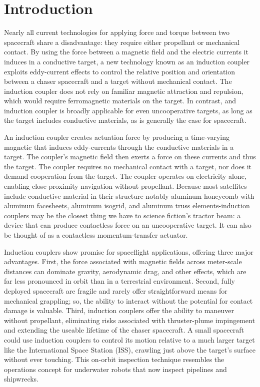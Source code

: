 \section{Introduction} 

Nearly all current technologies for applying force and torque between two spacecraft share a disadvantage: they require either propellant or mechanical contact. By using the force between a magnetic field and the electric currents it induces in a conductive target, a new technology known as an induction coupler exploits eddy-current effects to control the relative position and orientation between a chaser spacecraft and a target without mechanical contact. The induction coupler does not rely on familiar magnetic attraction and repulsion, which would require ferromagnetic materials on the target.  In contrast, and induction coupler is broadly applicable for even uncooperative targets, as long as the target includes conductive materials, as is generally the case for spacecraft.

An induction coupler creates actuation force by producing a time-varying magnetic that induces eddy-currents  through the conductive materials in a target. The coupler's magnetic field then exerts a force on these currents and thus the target. The coupler requires no mechanical contact with a target, nor does it demand cooperation from the target. The coupler operates on electricity alone, enabling close-proximity navigation without propellant. Because most satellites include conductive material in their structure-notably aluminum honeycomb with aluminum facesheets, aluminum isogrid, and aluminum truss elements-induction couplers may be the closest thing we have to science fiction's tractor beam: a device that can produce contactless force on an uncooperative target. It can also be thought of as a contactless momentum-transfer actuator.

Induction couplers show promise for spaceflight applications, offering three major advantages. First, the force associated with magnetic fields across meter-scale distances can dominate gravity, aerodynamic drag, and other effects, which are far less pronounced in orbit than in a terrestrial environment. Second, fully deployed spacecraft are fragile and rarely offer straightforward means for mechanical grappling; so, the ability to interact without the potential for contact damage is valuable. Third, induction couplers offer the ability to maneuver without propellant, eliminating risks associated with thruster-plume impingement \cite{BaerwaldR.S.1977}
and extending the useable lifetime of the chaser spacecraft.
A small spacecraft could use induction couplers to control its motion relative to a much larger target like the International Space Station (ISS), crawling just above the target's surface without ever touching. This on-orbit inspection technique resembles the operations concept for underwater robots that now inspect pipelines and shipwrecks. \cite{Whitcomb2000}

